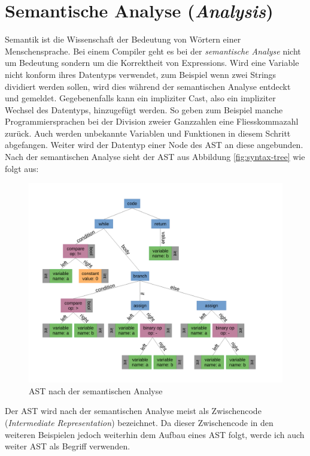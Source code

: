 \section{Semantische Analyse (\textit{Analysis})}
Semantik ist die Wissenschaft der Bedeutung von Wörtern einer Menschensprache. Bei einem Compiler geht es bei der \textit{semantische Analyse} nicht um Bedeutung sondern um die Korrektheit von Expressions.
Wird eine Variable nicht konform ihres Datentyps verwendet, zum Beispiel wenn zwei Strings dividiert werden sollen, wird dies während der semantischen Analyse entdeckt und gemeldet.
Gegebenenfalls kann ein impliziter Cast, also ein impliziter Wechsel des Datentyps, hinzugefügt werden.
So geben zum Beispiel manche Programmiersprachen bei der Division zweier Ganzzahlen eine Fliesskommazahl zurück.
Auch werden unbekannte Variablen und Funktionen in diesem Schritt abgefangen.
Weiter wird der Datentyp einer Node des AST an diese angebunden. Nach der semantischen Analyse sieht der AST aus Abbildung \ref{fig:syntax-tree} wie folgt aus:

\begin{figure}[H]
    \centering
    \includegraphics[scale=0.4]{resources/images/AST_with_types.pdf}
    \caption[AST nach der semantischen Analyse (Basierend auf Abbildung \ref{fig:syntax-tree})]{AST nach der semantischen Analyse}
    \label{fig:syntax-tree-with-types}
\end{figure}

Der AST wird nach der semantischen Analyse meist als Zwischencode (\textit{Intermediate Representation}) bezeichnet.
Da dieser Zwischencode in den weiteren Beispielen jedoch weiterhin dem Aufbau eines AST folgt, werde ich auch weiter AST als Begriff verwenden.



